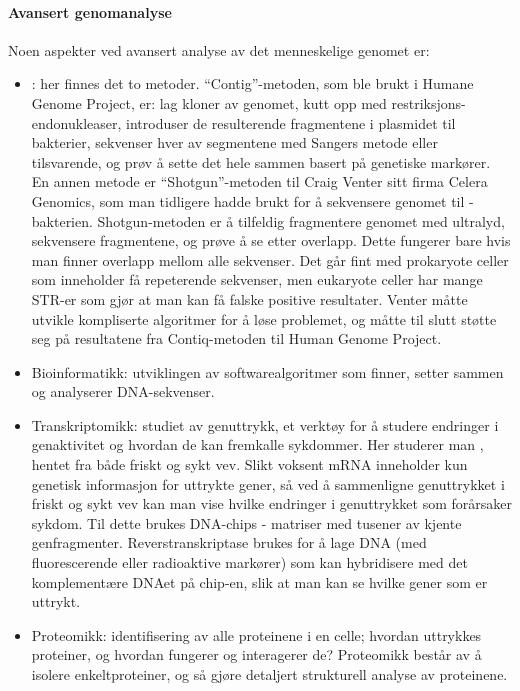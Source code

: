 \paragraph{Avansert genomanalyse} Noen aspekter ved avansert analyse av det menneskelige genomet er:
\begin{itemize}[nolistsep,noitemsep]
	\item {}: her finnes det to metoder. ``Contig''-metoden, som ble brukt i Humane Genome Project, er: lag kloner av genomet, kutt opp med restriksjons-endonukleaser, introduser de resulterende fragmentene i plasmidet til bakterier, sekvenser hver av segmentene med Sangers metode eller tilsvarende, og prøv å sette det hele sammen basert på genetiske markører. En annen metode er ``Shotgun''-metoden til Craig Venter sitt firma Celera Genomics, som man tidligere hadde brukt for å sekvensere genomet til -bakterien. Shotgun-metoden er å tilfeldig fragmentere genomet med ultralyd, sekvensere fragmentene, og prøve å se etter overlapp. Dette fungerer bare hvis man finner overlapp mellom alle sekvenser. Det går fint med prokaryote celler som inneholder få repeterende sekvenser, men eukaryote celler har mange STR-er som gjør at man kan få falske positive resultater. Venter måtte utvikle kompliserte algoritmer for å løse problemet, og måtte til slutt støtte seg på resultatene fra Contiq-metoden til Human Genome Project.
	\item Bioinformatikk: utviklingen av softwarealgoritmer som finner, setter sammen og analyserer DNA-sekvenser.
	\item Transkriptomikk: studiet av genuttrykk, et verktøy for å studere endringer i genaktivitet og hvordan de kan fremkalle sykdommer. Her studerer man , hentet fra både friskt og sykt vev. Slikt voksent mRNA inneholder kun genetisk informasjon for uttrykte gener, så ved å sammenligne genuttrykket i friskt og sykt vev kan man vise hvilke endringer i genuttrykket som forårsaker sykdom. Til dette brukes DNA-chips - matriser med tusener av kjente genfragmenter. Reverstranskriptase brukes for å lage DNA (med fluorescerende eller radioaktive markører) som kan hybridisere med det komplementære DNAet på chip-en, slik at man kan se hvilke gener som er uttrykt.
	\item Proteomikk: identifisering av alle proteinene i en celle; hvordan uttrykkes proteiner, og hvordan fungerer og interagerer de? Proteomikk består av å isolere enkeltproteiner, og så gjøre detaljert strukturell analyse av proteinene.
\end{itemize}

